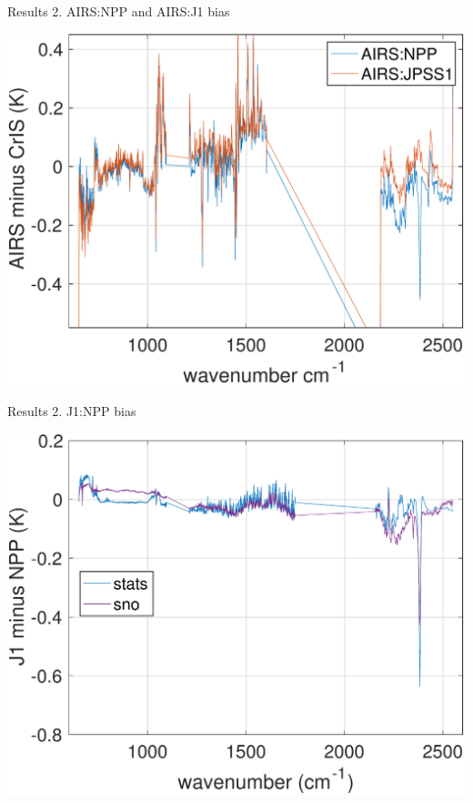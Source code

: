 \documentclass[10pt,t]{beamer}
\begin{document}
\begin{frame}{Results 2. AIRS:NPP and AIRS:J1 bias}

\vspace{-0.1in}
\begin{block}{}
  \begin{center}
    \includegraphics[width=0.6\linewidth]{./Figs/2018d060_2019d059_ac1_ac2_sno_mean_bias.pdf}
  \end{center}
\end{block}
    
\end{frame}

\begin{frame}{Results 2. J1:NPP bias}

\vspace{-0.1in}
\begin{block}{}
  \begin{center}
    \includegraphics[width=0.6\linewidth]{./Figs/2018_jn_ic1_ic2_stats_sno_bias.pdf}
  \end{center}
\end{block}
    
\end{frame}
\end{document}
